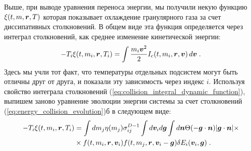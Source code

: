 Выше, при выводе уравнения переноса энергии, мы получили некую функцию $\xi(t,m,\bm{r},T)$ которая показывает охлаждение
гранулярного газа за счет диссипативных столкновений. В общем виде эта функция определяется через интеграл столкновений,
как среднее изменение кинетической энергии:
\begin{equation}
  -T_i\xi(t,m_i,\bm{r},T_i) = \int\frac{m_i\bm{v}^2}{2}I_c(t,m_i,\bm{r},\bm{v})\,d\bm{v}\;.
\end{equation}
Здесь мы учли тот факт, что температуры отдельных подсистем могут быть отличны друг от друга, и показали эту зависимость
через индекс $i$. Используя свойство интеграла столкновений (\ref{eq:collision_integral_dynamic_function}), выпишем заново 
уравнение эволюции энергии системы за счет столкновений (\ref{eq:energy_collision_evolution})б в следующем виде:
\begin{equation}
  \begin{split}
    -T_i\xi(t,m_i,\bm{r}, T_i) &= 
    \int dm_j\eta(m_j)\sigma^{D-1}_{ij}\int d\bm{v}_i d\bm{g}\int d\bm{n}\Theta(-\bm{g}\cdot\bm{n})\vert\bm{g}\cdot\bm{n}\vert\times \\
    &\times f(t,m_i,\bm{r},\bm{v}_i)f(t,m_j,\bm{r},\bm{v}_i-\bm{g})\delta E_i(\bm{v}_i,\bm{g}) \;.
  \end{split}
\end{equation}

